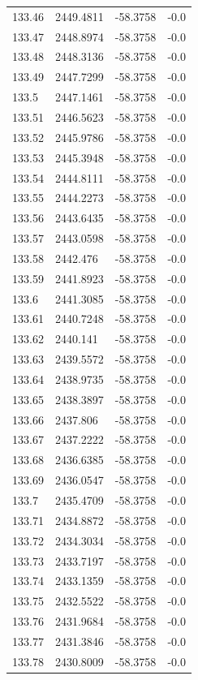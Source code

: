 \begin{table}[H]
\begin{tabular}{llll}
133.46 & 2449.4811 & -58.3758 & -0.0 \\
133.47 & 2448.8974 & -58.3758 & -0.0 \\
133.48 & 2448.3136 & -58.3758 & -0.0 \\
133.49 & 2447.7299 & -58.3758 & -0.0 \\
133.5 & 2447.1461 & -58.3758 & -0.0 \\
133.51 & 2446.5623 & -58.3758 & -0.0 \\
133.52 & 2445.9786 & -58.3758 & -0.0 \\
133.53 & 2445.3948 & -58.3758 & -0.0 \\
133.54 & 2444.8111 & -58.3758 & -0.0 \\
133.55 & 2444.2273 & -58.3758 & -0.0 \\
133.56 & 2443.6435 & -58.3758 & -0.0 \\
133.57 & 2443.0598 & -58.3758 & -0.0 \\
133.58 & 2442.476 & -58.3758 & -0.0 \\
133.59 & 2441.8923 & -58.3758 & -0.0 \\
133.6 & 2441.3085 & -58.3758 & -0.0 \\
133.61 & 2440.7248 & -58.3758 & -0.0 \\
133.62 & 2440.141 & -58.3758 & -0.0 \\
133.63 & 2439.5572 & -58.3758 & -0.0 \\
133.64 & 2438.9735 & -58.3758 & -0.0 \\
133.65 & 2438.3897 & -58.3758 & -0.0 \\
133.66 & 2437.806 & -58.3758 & -0.0 \\
133.67 & 2437.2222 & -58.3758 & -0.0 \\
133.68 & 2436.6385 & -58.3758 & -0.0 \\
133.69 & 2436.0547 & -58.3758 & -0.0 \\
133.7 & 2435.4709 & -58.3758 & -0.0 \\
133.71 & 2434.8872 & -58.3758 & -0.0 \\
133.72 & 2434.3034 & -58.3758 & -0.0 \\
133.73 & 2433.7197 & -58.3758 & -0.0 \\
133.74 & 2433.1359 & -58.3758 & -0.0 \\
133.75 & 2432.5522 & -58.3758 & -0.0 \\
133.76 & 2431.9684 & -58.3758 & -0.0 \\
133.77 & 2431.3846 & -58.3758 & -0.0 \\
133.78 & 2430.8009 & -58.3758 & -0.0 \\

\end{tabular}
\end{table}
